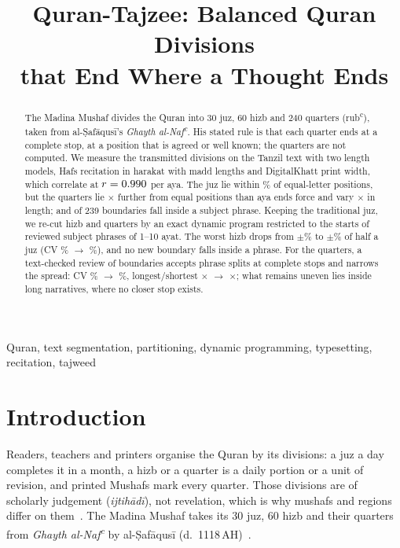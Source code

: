 \documentclass[conference]{IEEEtran}
\begin{document}
\title{Quran-Tajzee: Balanced Quran Divisions\\ that End Where a Thought Ends}

\author{
}

\maketitle

\begin{abstract}
The Madina Mushaf divides the Quran into 30 juz, 60 hizb and 240 quarters (rub\textsuperscript{c}),
taken from al-Ṣafāqusī's \emph{Ghayth al-Naf\textsuperscript{c}}. His stated rule is that each
quarter ends at a complete stop, at a position that is agreed or well known; the quarters are
not computed. We measure the transmitted divisions on the Tanzil text with two length models,
Hafs recitation in harakat with madd lengths and DigitalKhatt print width, which correlate at
$r=0.990$ per aya. The juz lie within \JuzOff\% of equal-letter positions, but the quarters
lie \RubExcess$\times$ further from equal positions than aya ends force and vary
\RubLetterSpread$\times$ in length; and \TradCuts{} of 239 boundaries fall inside a subject
phrase. Keeping the traditional juz, we re-cut hizb and quarters by an exact dynamic program
restricted to the starts of \Phrases{} reviewed subject phrases of 1--10 ayat. The worst hizb
drops from $\pm$\TradHizbWorst\% to $\pm$\NewHizbWorst\% of half a juz (CV \TradHizbCV\%
$\rightarrow$ \NewHizbCV\%), and no new boundary falls inside a phrase. For the quarters, a
text-checked review of \RubRoundBoundaries{} boundaries accepts \RubRoundSplits{} phrase splits at
complete stops and narrows the spread: CV \TradRubCV\% $\rightarrow$ \NewRubCV\%, longest/shortest
\TradRubRatio$\times$ $\rightarrow$ \NewRubRatio$\times$; what remains uneven lies inside long
narratives, where no closer stop exists.
\end{abstract}

\begin{IEEEkeywords}
Quran, text segmentation, partitioning, dynamic programming, typesetting, recitation, tajweed
\end{IEEEkeywords}

\section{Introduction}
Readers, teachers and printers organise the Quran by its divisions: a juz a day completes it in
a month, a hizb or a quarter is a daily portion or a unit of revision, and printed Mushafs mark
every quarter. Those divisions are of scholarly judgement (\emph{ijtihādī}), not revelation, which
is why mushafs and regions differ on them~\cite{hamad}. The Madina Mushaf takes its 30 juz, 60
hizb and their quarters from \emph{Ghayth al-Naf\textsuperscript{c}} by al-Ṣafāqusī (d.\ 1118\,AH)~\cite{ghayth,madina}.
\end{document}
